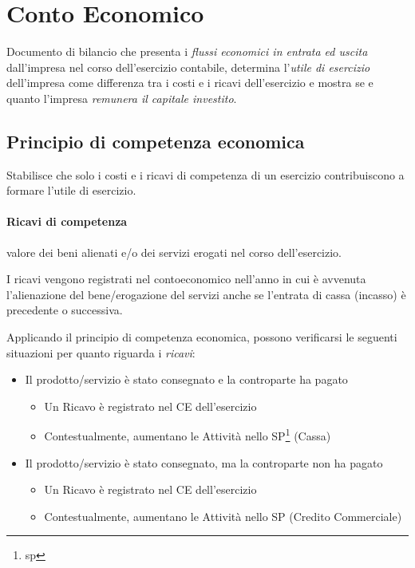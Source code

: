 \section{Conto Economico}
Documento di bilancio che presenta i \emph{flussi economici in entrata ed uscita} dall’impresa nel corso
dell’esercizio contabile, determina l’\emph{utile di esercizio} dell’impresa come differenza tra i costi e i
ricavi dell’esercizio e mostra se e quanto l’impresa \emph{remunera il capitale investito}.

\subsection{Principio di competenza economica}
Stabilisce che solo i costi e i ricavi di competenza di un esercizio contribuiscono
a formare l’utile di esercizio. 

\paragraph{Ricavi di competenza}
valore dei beni alienati e/o dei servizi erogati nel
corso dell’esercizio.

I ricavi vengono registrati nel \gls{contoeconomico} nell’anno in cui è avvenuta l’alienazione
del bene/erogazione del servizi anche se l’entrata di cassa (incasso) è
precedente o successiva.

Applicando il principio di competenza economica, possono verificarsi le
seguenti situazioni per quanto riguarda i \emph{ricavi}:
\begin{itemize}
    \item Il prodotto/servizio è stato consegnato e la controparte ha pagato
    \begin{itemize}
        \item Un Ricavo è registrato nel CE dell’esercizio
        \item Contestualmente, aumentano le Attività nello SP\footnote{\gls{sp}} (Cassa)
    \end{itemize}
    \item Il prodotto/servizio è stato consegnato, ma la controparte non ha pagato
    \begin{itemize}
        \item Un Ricavo è registrato nel CE dell’esercizio
        \item Contestualmente, aumentano le Attività nello SP (Credito Commerciale)
    \end{itemize}
\end{itemize}

